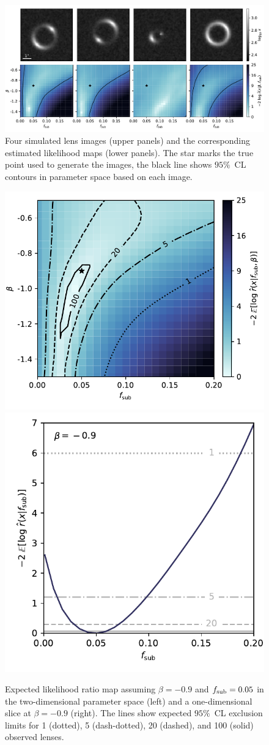 \documentclass[twocolumn]{aastex62}
\begin{document}
\begin{figure}
\centering
\includegraphics[width=1.\textwidth]{figures/individual_lens_predictions}
\caption{Four simulated lens images (upper panels) and the corresponding estimated likelihood maps (lower panels). The star marks the true point used to generate the images, the black line shows $95 \%$~CL contours in parameter space based on each image. }
\label{fig:individual_predictions}
\end{figure}

\begin{figure}
\centering
\includegraphics[height=0.4\textwidth]{figures/expected_likelihood_map}
\includegraphics[height=0.4\textwidth]{figures/expected_likelihood_slice}
\caption{Expected likelihood ratio map assuming $\beta = -0.9$ and $f_{\mathrm{sub}} = 0.05$ in the two-dimensional parameter space (left) and a one-dimensional slice at $\beta = -0.9$ (right). The lines show expected $95\%$~CL exclusion limits for 1 (dotted), 5 (dash-dotted), 20 (dashed), and 100 (solid) observed lenses. }
\label{fig:expected_likelihood}
\end{figure}
\end{document}
